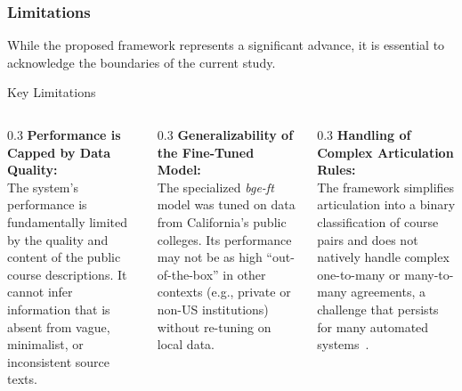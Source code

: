 \documentclass[aspectratio=169,10pt]{beamer}
\begin{document}
\begin{frame}
    \frametitle{Limitations}
    
    While the proposed framework represents a significant advance, it is essential to acknowledge the boundaries of the current study.
    
    \vspace{1mm}
    \begin{block}{Key Limitations}
        \hfill\vspace{-2mm}
        \begin{columns}[T]
            \begin{column}{0.3\textwidth}
                \textbf{Performance is Capped by Data Quality:}\\\vspace{1mm}
                The system's performance is fundamentally limited by the quality and content of the public course descriptions. It cannot infer information that is absent from vague, minimalist, or inconsistent source texts.
            \end{column}
            \hfill
            \begin{column}{0.3\textwidth}
                \textbf{Generalizability of the Fine-Tuned Model:}\\\vspace{1mm}
                The specialized \textit{bge-ft} model was tuned on data from California's public colleges. Its performance may not be as high ``out-of-the-box'' in other contexts (e.g., private or non-US institutions) without re-tuning on local data.
            \end{column}
            \hfill
            \begin{column}{0.3\textwidth}
                \textbf{Handling of Complex Articulation Rules:}\\\vspace{1mm}
                The framework simplifies articulation into a binary classification of course pairs and does not natively handle complex one-to-many or many-to-many agreements, a challenge that persists for many automated systems~\cite{pardos10.1145/3330430.3333622}.
            \end{column}
        \end{columns}
    \end{block}
    
\end{frame}
\end{document}
